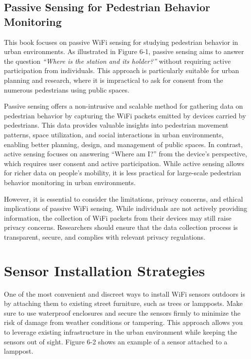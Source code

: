 \documentclass[
  letterpaper,
]{scrbook}
\begin{document}
\subsection*{Passive Sensing for Pedestrian Behavior
Monitoring}\label{passive-sensing-for-pedestrian-behavior-monitoring}

This book focuses on passive WiFi sensing for studying pedestrian
behavior in urban environments. As illustrated in Figure 6-1, passive
sensing aims to answer the question \emph{``Where is the station and its
holder?''} without requiring active participation from individuals. This
approach is particularly suitable for urban planning and research, where
it is impractical to ask for consent from the numerous pedestrians using
public spaces.

Passive sensing offers a non-intrusive and scalable method for gathering
data on pedestrian behavior by capturing the WiFi packets emitted by
devices carried by pedestrians. This data provides valuable insights
into pedestrian movement patterns, space utilization, and social
interactions in urban environments, enabling better planning, design,
and management of public spaces. In contrast, active sensing focuses on
answering ``Where am I?'' from the device's perspective, which requires
user consent and active participation. While active sensing allows for
richer data on people's mobility, it is less practical for large-scale
pedestrian behavior monitoring in urban environments.

However, it is essential to consider the limitations, privacy concerns,
and ethical implications of passive WiFi sensing. While individuals are
not actively providing information, the collection of WiFi packets from
their devices may still raise privacy concerns. Researchers should
ensure that the data collection process is transparent, secure, and
complies with relevant privacy regulations.

\section{Sensor Installation
Strategies}\label{sensor-installation-strategies}

One of the most convenient and discreet ways to install WiFi sensors
outdoors is by attaching them to existing street furniture, such as
trees or lampposts. Make sure to use waterproof enclosures and secure
the sensors firmly to minimize the risk of damage from weather
conditions or tampering. This approach allows you to leverage existing
infrastructure in the urban environment while keeping the sensors out of
sight. Figure 6-2 shows an example of a sensor attached to a lamppost.
\end{document}
